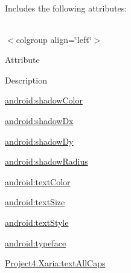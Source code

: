 Includes the following attributes\+:

\tabulinesep=1mm
\begin{longtabu} spread 0pt [c]{*{0}{|X[-1]}|}
\hline
\end{longtabu}
$<$colgroup align=\char`\"{}left\char`\"{}$>$ 

Attribute

Description 

{\ttfamily \hyperlink{classproject4_1_1xaria_1_1R_1_1styleable_a431d16372e40e52f770ef2d504ae3083}{android\+:shadow\+Color}}

{\ttfamily \hyperlink{classproject4_1_1xaria_1_1R_1_1styleable_a03f619c3ba347ef286757141c03559b5}{android\+:shadow\+Dx}}

{\ttfamily \hyperlink{classproject4_1_1xaria_1_1R_1_1styleable_ada1ad6d6bac889ac788f60bdf29ddc1c}{android\+:shadow\+Dy}}

{\ttfamily \hyperlink{classproject4_1_1xaria_1_1R_1_1styleable_ae958e2bce5916596d134543faa936c61}{android\+:shadow\+Radius}}

{\ttfamily \hyperlink{classproject4_1_1xaria_1_1R_1_1styleable_a2b25c50bd5f9e42c5a9fc5afb3dbcb37}{android\+:text\+Color}}

{\ttfamily \hyperlink{classproject4_1_1xaria_1_1R_1_1styleable_aee9f72e6edb60f105b97642812464a80}{android\+:text\+Size}}

{\ttfamily \hyperlink{classproject4_1_1xaria_1_1R_1_1styleable_aa7aadad2b1e03de56ffff6233004edd3}{android\+:text\+Style}}

{\ttfamily \hyperlink{classproject4_1_1xaria_1_1R_1_1styleable_a5f9cfadc1fc87f837610aa77360f6e3a}{android\+:typeface}}

{\ttfamily \hyperlink{classproject4_1_1xaria_1_1R_1_1styleable_ab717490758690b0582f6ffbc6ce728f4}{Project4.\+Xaria\+:text\+All\+Caps}}

